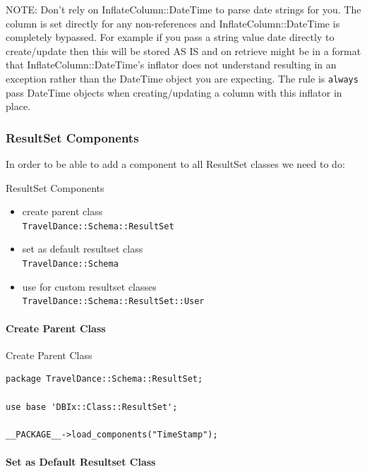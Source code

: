 NOTE: Don't rely on InflateColumn::DateTime to parse date strings for
you. The column is set directly for any non-references and
InflateColumn::DateTime is completely bypassed. For example if you pass a
string value date directly to create/update then this will be stored AS IS
and on retrieve might be in a format that InflateColumn::DateTime’s inflator
does not understand resulting in an exception rather than the DateTime
object you are expecting. The rule is \verb|always| pass DateTime objects when
creating/updating a column with this inflator in place.

\subsubsection{ResultSet Components}

In order to be able to add a component to all ResultSet classes we need to
do:

\begin{frame}[fragile]{ResultSet Components}
\begin{itemize}
\item create parent class \\
  \verb|TravelDance::Schema::ResultSet|
\item set as default resultset class \\
  \verb|TravelDance::Schema|
\item use for custom resultset classes \\
 \verb|TravelDance::Schema::ResultSet::User|
\end{itemize}
\end{frame}

\paragraph{Create Parent Class}

\begin{frame}[fragile]{Create Parent Class}
\begin{lstlisting}
package TravelDance::Schema::ResultSet;

use base 'DBIx::Class::ResultSet';

__PACKAGE__->load_components("TimeStamp");
\end{lstlisting}
\end{frame}

\paragraph{Set as Default Resultset Class}

